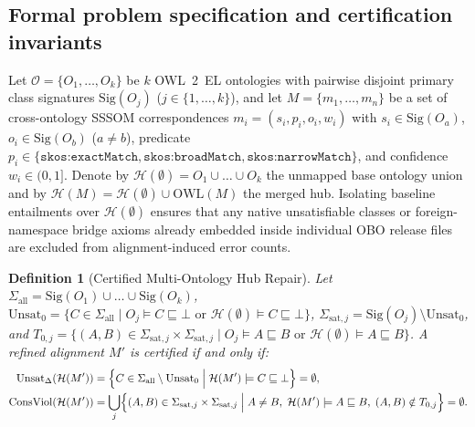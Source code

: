 \documentclass[10pt]{article}
\theoremstyle{accentdef}
\newtheorem{definition}{Definition}
\begin{document}
\subsection*{Formal problem specification and certification invariants}

Let $\mathcal{O} = \{O_1, \dots, O_k\}$ be $k$ OWL~2~EL ontologies with pairwise disjoint primary class signatures $\mathrm{Sig}(O_j)$ ($j \in \{1, \dots, k\}$), and let $M = \{m_1, \dots, m_n\}$ be a set of cross-ontology SSSOM correspondences $m_i = (s_i, p_i, o_i, w_i)$ with $s_i \in \mathrm{Sig}(O_a)$, $o_i \in \mathrm{Sig}(O_b)$ ($a \neq b$), predicate $p_i \in \{\texttt{skos:exactMatch}, \texttt{skos:broadMatch}, \texttt{skos:narrowMatch}\}$, and confidence $w_i \in (0, 1]$. Denote by $\mathcal{H}(\emptyset) = O_1 \cup \dots \cup O_k$ the unmapped base ontology union and by $\mathcal{H}(M) = \mathcal{H}(\emptyset) \cup \mathrm{OWL}(M)$ the merged hub. Isolating baseline entailments over $\mathcal{H}(\emptyset)$ ensures that any native unsatisfiable classes or foreign-namespace bridge axioms already embedded inside individual OBO release files are excluded from alignment-induced error counts.

\begin{definition}[Certified Multi-Ontology Hub Repair]
\label{def:certification}
Let $\Sigma_{\mathrm{all}} = \mathrm{Sig}(O_1) \cup \dots \cup \mathrm{Sig}(O_k)$, $\mathrm{Unsat}_0 = \{C \in \Sigma_{\mathrm{all}} \mid O_j \models C \sqsubseteq \bot \text{ or } \mathcal{H}(\emptyset) \models C \sqsubseteq \bot\}$, $\Sigma_{\mathrm{sat},j} = \mathrm{Sig}(O_j) \setminus \mathrm{Unsat}_0$, and $T_{0,j} = \{(A, B) \in \Sigma_{\mathrm{sat},j} \times \Sigma_{\mathrm{sat},j} \mid O_j \models A \sqsubseteq B \text{ or } \mathcal{H}(\emptyset) \models A \sqsubseteq B\}$. A refined alignment $M'$ is \emph{certified} if and only if:
\begin{align}
  \mathrm{Unsat}_{\Delta}(\mathcal{H}(M')) &= \Bigl\{ C \in \Sigma_{\mathrm{all}} \setminus \mathrm{Unsat}_0 \;\Big|\; \mathcal{H}(M') \models C \sqsubseteq \bot \Bigr\} = \emptyset, \label{eq:unsat_delta}\\
  \mathrm{ConsViol}(\mathcal{H}(M')) &= \bigcup_{j} \Bigl\{ (A, B) \in \Sigma_{\mathrm{sat},j} \times \Sigma_{\mathrm{sat},j} \;\Big|\; A \neq B,\; \mathcal{H}(M') \models A \sqsubseteq B,\; (A, B) \notin T_{0,j} \Bigr\} = \emptyset. \label{eq:consviol}
\end{align}
\end{definition}
\end{document}
